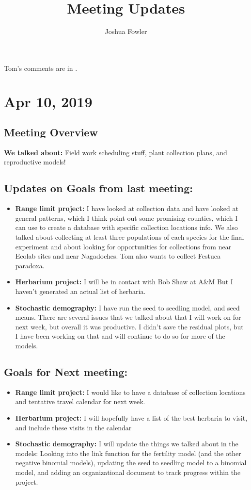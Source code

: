 \documentclass{article}
\title{Meeting Updates}
\author{Joshua Fowler}
\newcommand{\tom}[1]{{\textit{\color{WildStrawberry}{[#1]}}}}
\begin{document}
%
  \maketitle
  Tom's comments are in \tom{WildStrawberry}.

\section*{Apr 10, 2019}
\subsection*{Meeting Overview}
\textbf{We talked about:}
Field work scheduling stuff, plant collection plans, and reproductive models!

\subsection*{Updates on Goals from last meeting:}
\begin{itemize}
\item{\textbf{Range limit project:} I have looked at collection data and have looked at general patterns, which I think point out some promising counties, which I can use to create a database with specific collection locations info. We also talked about collecting at least three populations of each species for the final experiment and about looking for opportunities for collections from near Ecolab sites and near Nagadoches. Tom also wants to collect Festuca paradoxa.}
\item{\textbf{Herbarium project:} I will be in contact with Bob Shaw at A\&M But I haven't generated an actual list of herbaria.}
\item{\textbf{Stochastic demography:} I have run the seed to seedling model, and seed means. There are several issues that we talked about that I will work on for next week, but overall it was productive. I didn't save the residual plots, but I have been working on that and will continue to do so for more of the models.}
\end{itemize}

\subsection*{Goals for Next meeting:}
\begin{itemize}
\item{\textbf{Range limit project:} I would like to have a database of collection locations and  tentative travel calendar for next week.}
\item{\textbf{Herbarium project:} I will hopefully have a list of the best herbaria to visit, and include these visits in the calendar}
\item{\textbf{Stochastic demography:} I will update the things we talked about in the models: Looking into the link function for the fertility model (and the other negative binomial models), updating the seed to seedling model to a binomial model, and adding an organizational document to track progress within the project.}
\end{itemize}
 
\end{document}
